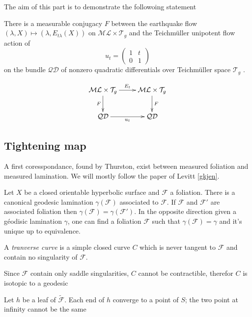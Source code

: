 The aim of this part is to demonstrate the followoing statement

\begin{thm}
There is a measurable conjugacy $F$ between the earthquake flow $(\lambda , X) \mapsto (\lambda, E_{t \lambda}(X))$ on $\mathcal{ML}\times \mathcal{T}_g $ and the Teichmüller unipotent flow action of \[
u_t = \begin{pmatrix} 1 & t \\ 0 & 1 \end{pmatrix}
\]
on the bundle $\mathcal{QD}$ of nonzero quadratic differentials over Teichmüller space $\mathcal{T}_g$ .
\end{thm}

\[
\xymatrix{
  \mathcal{ML}\times \mathcal{T}_g  \ar[r]^{E_t} \ar[d]_F  & \mathcal{ML}\times \mathcal{T}_g \ar[d]^F \\
   \mathcal{QD} \ar[r]_{u_t} & \mathcal{QD}
 }
\]

\subsection{Tightening map}%

A first coresspondance, found by Thurston, exist between measured foliation and measured lamination. We will mostly follow the paper of Levitt \ref{gkjen}.

\begin{thm}
Let $X$ be a closed orientable hyperbolic surface and $\mathcal{F}$ a foliation. There is a canonical geodesic lamination $\gamma(\mathcal{F})$ associated to $\mathcal{F}$. If $\mathcal{F}$ and $\mathcal{F}'$ are associated foliation then $\gamma(\mathcal{F})= \gamma(\mathcal{F}')$. In the opposite direction given a géodisic lamination $\gamma$, one can find a foliation $\mathcal{F}$ such that $\gamma(\mathcal{F})=\gamma$ and it's unique up to equivalence.
\end{thm}
\begin{dfnt}
A \emph{tranverse curve} is a simple closed curve $C$ which is never tangent to $\mathcal{F}$ and contain no singularity of $\mathcal{F}$.
\end{dfnt}

\begin{rmq}
Since $\mathcal{F}$ contain only saddle singularities, $C$ cannot be contractible, therefor $C$ is isotopic to a geodesic
\end{rmq}

\begin{lem}
Let $h$ be a leaf of $\mathcal{\tilde{F}}$. Each end of $h$ converge to a point of $S$; the two point at infinity cannot be the same
\end{lem}

